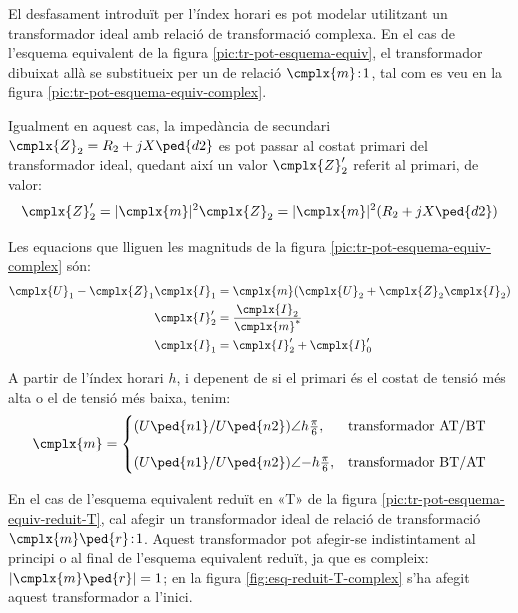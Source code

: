 El desfasament introduït per l'índex horari es pot modelar utilitzant  un transformador ideal amb relació de transformació complexa. En el cas de l'esquema equivalent de la figura  \vref{pic:tr-pot-esquema-equiv}, el transformador  dibuixat allà
se substitueix per un de relació $\cmplx{m}\!:\!1$, tal com es veu en la figura \vref{pic:tr-pot-esquema-equiv-complex}.

\begin{center}
    
    \label{pic:tr-pot-esquema-equiv-complex}
\end{center}

Igualment en aquest cas, la impedància de secundari $\cmplx{Z}_2=R_2 + j X\ped{d2}$ es pot passar al costat primari del transformador ideal, quedant així un valor $\cmplx{Z}_2'$ referit al primari, de valor:
\begin{equation}
    \cmplx{Z}_2' = |\cmplx{m}|^2 \cmplx{Z}_2  = |\cmplx{m}|^2 (R_2 + j X\ped{d2})\label{eq:ZmZ}
\end{equation}

Les equacions que lliguen les magnituds de la figura \vref{pic:tr-pot-esquema-equiv-complex} són:
\begin{subequations}
\begin{align}
    \cmplx{U}_1 - \cmplx{Z}_1 \cmplx{I}_1 &= \cmplx{m} ( \cmplx{U}_2  + \cmplx{Z}_2 \cmplx{I}_2 ) \label{eq:UmZ}\\
    \cmplx{I}'_2 &= \frac{\cmplx{I}_2}{\cmplx{m}^*} \label{eq:ImI}\\
    \cmplx{I}_1  &=   \cmplx{I}_2' + \cmplx{I}_0' \label{eq:III}
\end{align}
\end{subequations}

A partir de l'índex horari $h$, i depenent de si el primari és el costat de tensió més alta o el de tensió més baixa, tenim:
\begin{equation}
\cmplx{m} = \begin{cases}
     (U\ped{n1}/U\ped{n2})\angle h \frac{\pi}{6}, & \text{transformador AT/BT}\\[2.7ex]
     (U\ped{n1}/U\ped{n2})\angle{-h} \frac{\pi}{6}, & \text{transformador BT/AT}
\end{cases}
\label{eq:rel-transf-cmplx}
\end{equation}

En el cas de l'esquema equivalent reduït en «T» de la figura \vref{pic:tr-pot-esquema-equiv-reduit-T}, cal afegir un transformador ideal de relació de transformació  $\cmplx{m}\ped{r}\!:\!1$. Aquest transformador pot afegir-se indistintament  al principi o al final de l'esquema equivalent reduït, ja que es compleix: $|\cmplx{m}\ped{r}|=1$;  en la figura \vref{fig:esq-reduit-T-complex} s'ha afegit aquest transformador a l'inici.


